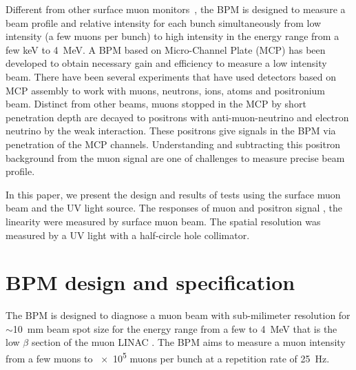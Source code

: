 \documentclass[preprint,3p,twocolumn]{elsarticle}
\begin{document}
Different from other surface muon monitors~\cite{muon_bpm1, muon_bpm3}, the BPM is designed to measure a beam profile 
and relative intensity for each bunch simultaneously from low intensity (a few muons per bunch) to high intensity in the energy range from a few \si{keV} to \SI{4}{\MeV}.
A BPM based on Micro-Channel Plate (MCP) has been developed to obtain necessary gain and efficiency to measure a low intensity beam.
There have been several experiments that have used detectors based on MCP assembly to work with muons, neutrons, ions, atoms and positronium~\cite{muon_bpm2, neutron, Ps} beam.
Distinct from other beams, muons stopped in the MCP by short penetration depth are decayed to positrons with anti-muon-neutrino and electron neutrino by the weak interaction. These positrons give signals in the BPM via penetration of the MCP channels. 
Understanding and subtracting this positron background from the muon signal are one of challenges to measure precise beam profile. %

In this paper, we present the design and results of tests using the surface muon beam and the UV light source.
The responses of muon and positron signal %
, the linearity %
were measured by surface muon beam.
The spatial resolution was measured by a UV light with a half-circle hole collimator.


\section{BPM design and specification}

The BPM is designed to diagnose a muon beam with %
sub-milimeter resolution for $\sim$\SI{10}{\mm} beam spot size for the energy range from a few to \SI{4}{\MeV} that is the low $\beta$ section of the muon LINAC \cite{IH}.
The BPM aims to measure a muon intensity from a few muons to \num{e5} muons per bunch at a repetition rate of \SI{25}{\hertz}. %
\end{document}
